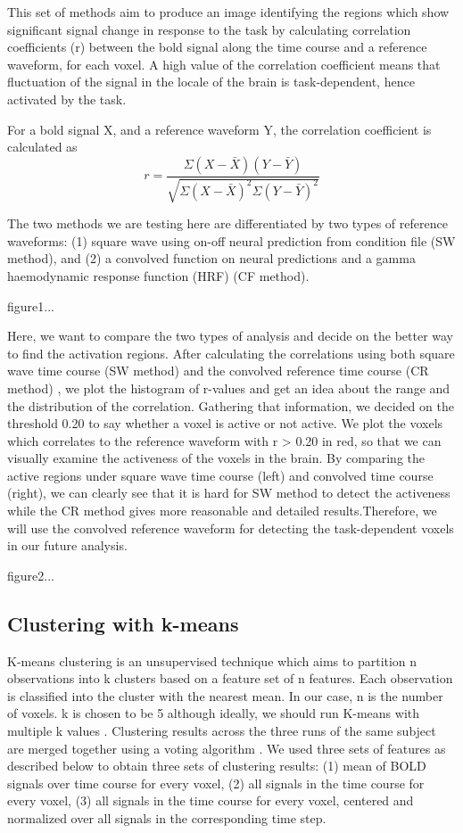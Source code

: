 \documentclass[11pt]{article}
\begin{document}
This set of methods aim to produce an image identifying the regions which show
significant signal change in response to the task by calculating correlation
coefficients (r) between the bold signal along the time course and a reference
waveform, for each voxel. A high value of the correlation coefficient means that
fluctuation of the signal in the locale of the brain is task-dependent, hence
activated by the task.

For a bold signal X, and a reference waveform Y, the correlation coefficient is
calculated as 
\begin{equation}
r = \frac{\Sigma  ( X-\bar{X}) ( Y-\bar{Y})}{\sqrt{ \Sigma ( X-\bar{X} ) ^2 \Sigma ( Y-\bar{Y})  ^2 }}
\end{equation}

The two methods we are testing here are differentiated by two types of reference
waveforms: (1) square wave using on-off neural prediction from condition file
(SW method), and (2) a convolved function on neural predictions and a gamma
haemodynamic response function (HRF) (CF method). 

figure1...

Here, we want to compare the two types of analysis and decide on the better way
to find the activation regions. After calculating the correlations using both
square wave time course (SW method) and the convolved reference time course (CR
method) , we plot the histogram of r-values and get an idea about the range and
the distribution of the correlation. Gathering that information, we decided on
the threshold 0.20 to say whether a voxel is active or not active. We plot the
voxels which correlates to the reference waveform with r > 0.20 in red, so that
we can visually examine the activeness of the voxels in the brain. By comparing
the active regions under square wave time course (left) and convolved time
course (right), we can clearly see that it is hard for SW method to detect the
activeness while the CR method gives more reasonable and detailed
results.Therefore, we will use the convolved reference waveform for detecting
the task-dependent voxels in our future analysis.

figure2...


\subsection{Clustering with k-means}

K-means clustering is an unsupervised technique which aims to partition n
observations into k clusters based on a feature set of n features. Each
observation is classified into the cluster with the nearest mean. In our case, n
is the number of voxels. k is chosen to be 5 although ideally, we should run
K-means with multiple k values \cite{venkataraman2009}. Clustering results
across the three runs of the same subject are merged together using a voting
algorithm \cite{dimitriadou2002}. We used three sets of features as described
below to obtain three sets of clustering results: (1) mean of BOLD signals over
time course for every voxel, (2) all signals in the time course for every voxel,
(3) all signals in the time course for every voxel, centered and normalized over
all signals in the corresponding time step. 
\end{document}
